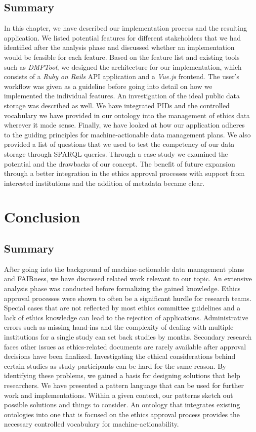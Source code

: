 \documentclass[10pt]{article}
\begin{document}
\subsection{Summary}
In this chapter, we have described our implementation process and the resulting application. We listed potential features for different stakeholders that we had identified after the analysis phase and discussed whether an implementation would be feasible for each feature. Based on the feature list and existing tools such as \textit{DMPTool}, we designed the architecture for our implementation, which consists of a \textit{Ruby on Rails} API application and a \textit{Vue.js} frontend. The user's workflow was given as a guideline before going into detail on how we implemented the individual features. An investigation of the ideal public data storage was described as well. We have integrated PIDs and the controlled vocabulary we have provided in our ontology into the management of ethics data wherever it made sense. Finally, we have looked at how our application adheres to the guiding principles for machine-actionable data management plans. We also provided a list of questions that we used to test the competency of our data storage through SPARQL queries. Through a case study we examined the potential and  the drawbacks of our concept. The benefit of future expansion through a better integration in the ethics approval processes with support from interested institutions and the addition of metadata became clear.

\newpage

\section{Conclusion}
\label{sec:conclusion}

\subsection{Summary}
After going into the background of machine-actionable data management plans and FAIRness, we have discussed related work relevant to our topic. An extensive analysis phase was conducted before formalizing the gained knowledge. Ethics approval processes were shown to often be a significant hurdle for research teams. Special cases that are not reflected by most ethics committee guidelines and a lack of ethics knowledge can lead to the rejection of applications. Administrative errors such as missing hand-ins and the complexity of dealing with multiple institutions for a single study can set back studies by months. Secondary research faces other issues as ethics-related documents are rarely available after approval decisions have been finalized. Investigating the ethical considerations behind certain studies as study participants can be hard for the same reason. By identifying these problems, we gained a basis for designing solutions that help researchers. We have presented a pattern language that can be used for further work and implementations. Within a given context, our patterns sketch out possible solutions and things to consider. An ontology that integrates existing ontologies into one that is focused on the ethics approval process provides the necessary controlled vocabulary for machine-actionability. 
\end{document}
